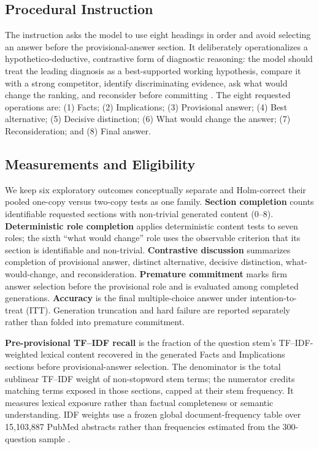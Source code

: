 \documentclass[10pt]{article}
\begin{document}
\subsection{Procedural Instruction}
The instruction asks the model to use eight headings in order and avoid selecting an answer before the provisional-answer section. It deliberately operationalizes a hypothetico-deductive, contrastive form of diagnostic reasoning: the model should treat the leading diagnosis as a best-supported working hypothesis, compare it with a strong competitor, identify discriminating evidence, ask what would change the ranking, and reconsider before committing \citep{kassirer1983hypothesis,charlin2000scripts,bowen2006reasoning}. The eight requested operations are: (1) Facts; (2) Implications; (3) Provisional answer; (4) Best alternative; (5) Decisive distinction; (6) What would change the answer; (7) Reconsideration; and (8) Final answer.

\subsection{Measurements and Eligibility}
We keep six exploratory outcomes conceptually separate and Holm-correct their pooled one-copy versus two-copy tests as one family. \textbf{Section completion} counts identifiable requested sections with non-trivial generated content (0--8). \textbf{Deterministic role completion} applies deterministic content tests to seven roles; the sixth ``what would change'' role uses the observable criterion that its section is identifiable and non-trivial. \textbf{Contrastive discussion} summarizes completion of provisional answer, distinct alternative, decisive distinction, what-would-change, and reconsideration. \textbf{Premature commitment} marks firm answer selection before the provisional role and is evaluated among completed generations. \textbf{Accuracy} is the final multiple-choice answer under intention-to-treat (ITT). Generation truncation and hard failure are reported separately rather than folded into premature commitment.

\textbf{Pre-provisional TF--IDF recall} is the fraction of the question stem's TF--IDF-weighted lexical content recovered in the generated Facts and Implications sections before provisional-answer selection. The denominator is the total sublinear TF--IDF weight of non-stopword stem terms; the numerator credits matching terms exposed in those sections, capped at their stem frequency. It measures lexical exposure rather than factual completeness or semantic understanding. IDF weights use a frozen global document-frequency table over 15,103,887 PubMed abstracts rather than frequencies estimated from the 300-question sample \citep{salton1988term}.
\end{document}
